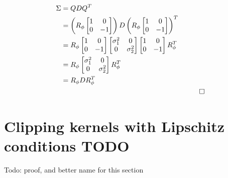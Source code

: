 \documentclass[a4paper, 12pt]{report}
\def\comment#1{\color{red}#1\color{black}}
\begin{document}
\begin{align}
	\Sigma&=QDQ^T \\
	&= \left(R_\phi \begin{bmatrix}
		1  &  0  \\
		0  &  -1
	\end{bmatrix}\right)D\left(R_\phi \begin{bmatrix}
		1  &  0  \\
		0  &  -1
	\end{bmatrix}\right)^T \\
	&= R_\phi \begin{bmatrix}
		1  &  0  \\
		0  &  -1
	\end{bmatrix} \begin{bmatrix}
		\sigma_1^2  &  0  \\
		0  &  \sigma_2^2
	\end{bmatrix} \begin{bmatrix}
		1  &  0  \\
		0  &  -1
	\end{bmatrix} R_\phi^T \\
	&= R_\phi \begin{bmatrix}
		\sigma_1^2  &  0  \\
		0  &  \sigma_2^2
	\end{bmatrix} R_\phi^T \\
	&= R_\phi D R_\phi^T \\&&\qed\nonumber
\end{align}
\newpage
\section{Clipping kernels with Lipschitz conditions \comment{TODO}}
\label{sec:lipschitz}
\comment{Todo: proof, and better name for this section}

\newpage
\end{document}
